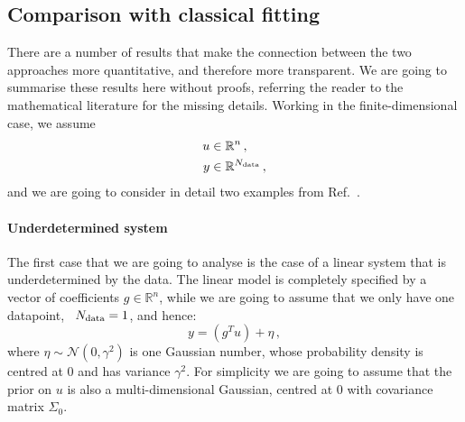 \subsection{Comparison with classical fitting}
\label{sec:comp-class-fit}

There are a number of results that make the connection between the two
approaches more quantitative, and therefore more transparent. We are
going to summarise these results here without proofs, referring the
reader to the mathematical literature for the missing details. Working
in the finite-dimensional case, we assume 
\begin{align*}
  u &\in \mathbb{R}^n \, ,\\
  y &\in \mathbb{R}^{N_{\rm data}}\, ,
\end{align*}
and we are going to consider in detail two examples from Ref.~\cite{StuartCore}.

\paragraph{Underdetermined system}
The first case that we are going to analyse is the case of a linear system that
is underdetermined by the data. The linear model is completely specified by a
vector of coefficients $g\in \mathbb{R}^n$, while we are going to assume that we
only have one datapoint, \ie\ $N_{\rm data}=1$, and hence:
\begin{equation}
  \label{eq:LinearModelEx}
  y = (g^T u) + \eta\, ,
\end{equation}
where $\eta \sim \mathcal{N}(0,\gamma^2)$ is one Gaussian number, whose
probability density is centred at $0$ and has variance $\gamma^2$. For
simplicity we are going to assume that the prior on $u$ is also a
multi-dimensional Gaussian, centred at $0$ with covariance matrix $\Sigma_0$. 

